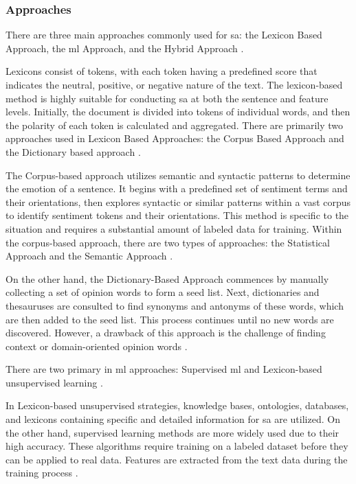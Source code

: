 \documentclass[a4paper,fleqn]{cas-sc}
\begin{document}
\subsubsection{Approaches}

There are three main approaches commonly used for \gls{sa}: the Lexicon Based Approach, the \gls{ml} Approach, and the Hybrid Approach \cite{wankhade_survey_2022, kaur_survey_2017}.

Lexicons consist of tokens, with each token having a predefined score that indicates the neutral, positive, or negative nature of the text. The lexicon-based method is highly suitable for conducting \gls{sa} at both the sentence and feature levels. Initially, the document is divided into tokens of individual words, and then the polarity of each token is calculated and aggregated. There are primarily two approaches used in Lexicon Based Approaches: the Corpus Based Approach and the Dictionary based approach \cite{wankhade_survey_2022}.

The Corpus-based approach utilizes semantic and syntactic patterns to determine the emotion of a sentence. It begins with a predefined set of sentiment terms and their orientations, then explores syntactic or similar patterns within a vast corpus to identify sentiment tokens and their orientations. This method is specific to the situation and requires a substantial amount of labeled data for training. Within the corpus-based approach, there are two types of approaches: the Statistical Approach and the Semantic Approach \cite{wankhade_survey_2022, kaur_survey_2017}.

On the other hand, the Dictionary-Based Approach commences by manually collecting a set of opinion words to form a seed list. Next, dictionaries and thesauruses are consulted to find synonyms and antonyms of these words, which are then added to the seed list. This process continues until no new words are discovered. However, a drawback of this approach is the challenge of finding context or domain-oriented opinion words \cite{wankhade_survey_2022, kaur_survey_2017}.

There are two primary in \gls{ml} approaches: Supervised \gls{ml} and Lexicon-based unsupervised learning \cite{wankhade_survey_2022}.

In Lexicon-based unsupervised strategies, knowledge bases, ontologies, databases, and lexicons containing specific and detailed information for \gls{sa} are utilized. On the other hand, supervised learning methods are more widely used due to their high accuracy. These algorithms require training on a labeled dataset before they can be applied to real data. Features are extracted from the text data during the training process \cite{kaur_survey_2017}.
\end{document}
